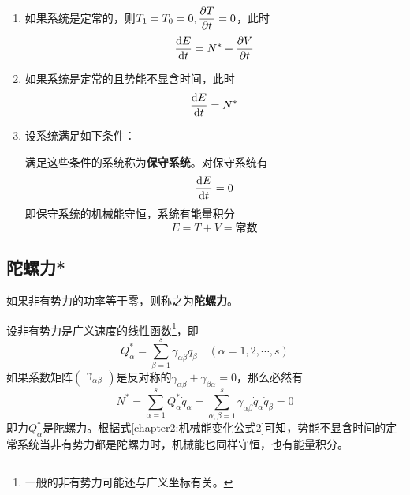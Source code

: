 \begin{enumerate}
\item 如果系统是定常的，则$T_1=T_0=0, \dfrac{\partial T}{\partial t} = 0$，此时
\begin{equation}
	\frac{\mathrm{d} E}{\mathrm{d} t} = N^* + \frac{\partial V}{\partial t}
\end{equation}
\item 如果系统是定常的且势能不显含时间，此时
\begin{equation}
	\frac{\mathrm{d} E}{\mathrm{d} t} = N^*
	\label{chapter2:机械能变化公式2}
\end{equation}
\item 设系统满足如下条件：满足这些条件的系统称为{\bf 保守系统}。对保守系统有
\begin{equation}
	\frac{\mathrm{d} E}{\mathrm{d} t} = 0
\end{equation}
即保守系统的机械能守恒，系统有能量积分
\begin{equation}
	E = T+V = \text{常数}
\end{equation}
\end{enumerate}

\subsection{陀螺力*}

如果非有势力的功率等于零，则称之为{\bf 陀螺力}。

设非有势力是广义速度的线性函数\footnote{一般的非有势力可能还与广义坐标有关。}，即
\begin{equation*}
	Q_\alpha^* = \sum_{\beta=1}^s \gamma_{\alpha\beta}\dot{q}_\beta\quad (\alpha=1,2,\cdots,s)
\end{equation*}
如果系数矩阵$\begin{pmatrix} \gamma_{\alpha\beta} \end{pmatrix}$是反对称的$\gamma_{\alpha\beta}+\gamma_{\beta\alpha}=0$，那么必然有
\begin{equation*}
	N^* = \sum_{\alpha=1}^s Q_\alpha^*\dot{q}_\alpha = \sum_{\alpha,\beta=1}^s \gamma_{\alpha\beta} \dot{q}_\alpha\dot{q}_\beta = 0
\end{equation*}
即力$Q_\alpha^*$是陀螺力。根据式\eqref{chapter2:机械能变化公式2}可知，势能不显含时间的定常系统当非有势力都是陀螺力时，机械能也同样守恒，也有能量积分。

